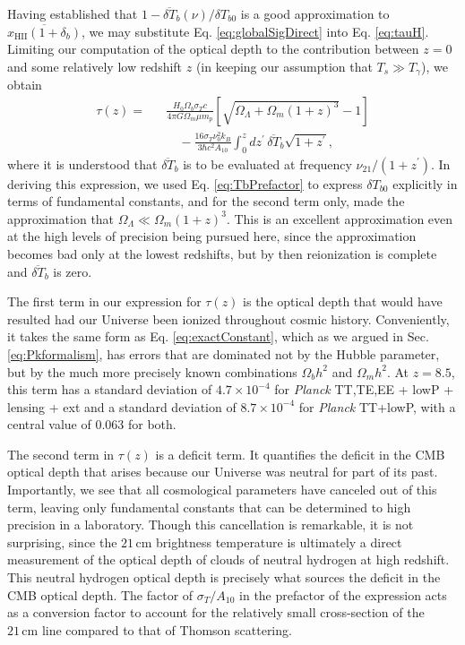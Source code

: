 \documentclass[twocolumn,aps,prd,nofootinbib,showpacs,superscriptaddress]{revtex4-1}
\begin{document}
Having established that $1- \overline{\delta T}_b (\nu)/\delta T_{b0}$ is a good approximation to $\overline{x_\textrm{HII} (1+\delta_b)}$, we may substitute Eq. \eqref{eq:globalSigDirect} into Eq. \eqref{eq:tauH}. Limiting our computation of the optical depth to the contribution between $z=0$ and some relatively low redshift $z$ (in keeping our assumption that $T_s \gg T_\gamma$), we obtain
\begin{eqnarray}
\tau(z) = &&\frac{H_0 \Omega_b \sigma_Tc}{4 \pi G \Omega_m \mu m_p} \left[ \sqrt{\Omega_\Lambda + \Omega_m (1+z)^3} -1 \right] \nonumber \\
&&\quad - \frac{16 \sigma_T \nu_0^2 k_B}{3 \hbar c^2 A_{10}} \int_0^z dz^\prime \, \overline{\delta T}_b \sqrt{1+z^\prime},
\end{eqnarray}
where it is understood that $\overline{\delta T}_b$ is to be evaluated at frequency $\nu_{21} / (1+z^\prime)$. In deriving this expression, we used Eq. \eqref{eq:TbPrefactor} to express $\delta T_{b0}$ explicitly in terms of fundamental constants, and for the second term only, made the approximation that $\Omega_\Lambda \ll \Omega_m (1+z)^3$. This is an excellent approximation even at the high levels of precision being pursued here, since the approximation becomes bad only at the lowest redshifts, but by then reionization is complete and $\overline{\delta T}_b$ is zero.

The first term in our expression for $\tau(z)$ is the optical depth that would have resulted had our Universe been ionized throughout cosmic history. Conveniently, it takes the same form as Eq. \eqref{eq:exactConstant}, which as we argued in Sec. \ref{eq:Pkformalism}, has errors that are dominated not by the Hubble parameter, but by the much more precisely known combinations $\Omega_b h^2$ and $\Omega_m h^2$. At $z=8.5$, this term has a standard deviation of $4.7\times 10^{-4}$ for \emph{Planck} TT,TE,EE + lowP + lensing + ext and a standard deviation of $8.7 \times 10^{-4}$ for \emph{Planck} TT+lowP, with a central value of $0.063$ for both.

The second term in $\tau(z)$ is a deficit term. It quantifies the deficit in the CMB optical depth that arises because our Universe was neutral for part of its past. Importantly, we see that all cosmological parameters have canceled out of this term, leaving only fundamental constants that can be determined to high precision in a laboratory. Though this cancellation is remarkable, it is not surprising, since the $21\,\textrm{cm}$ brightness temperature is ultimately a direct measurement of the optical depth of clouds of neutral hydrogen at high redshift. This neutral hydrogen optical depth is precisely what sources the deficit in the CMB optical depth. The factor of $\sigma_T  / A_{10} $ in the prefactor of the expression acts as a conversion factor to account for the relatively small cross-section of the $21\,\textrm{cm}$ line compared to that of Thomson scattering.
\end{document}
